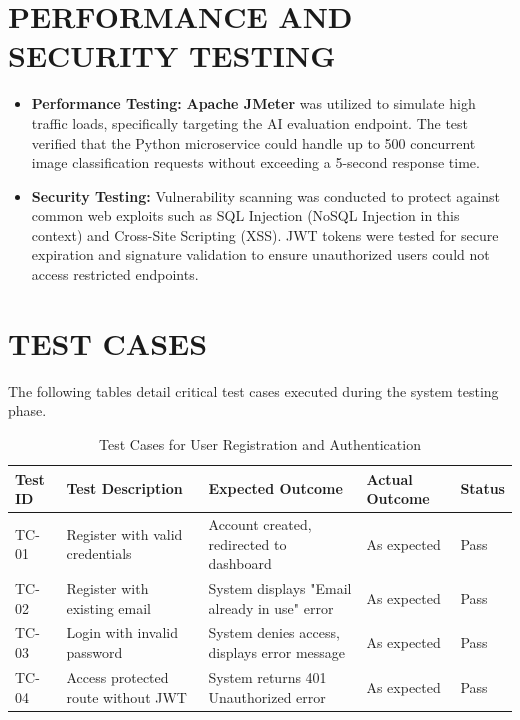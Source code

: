 \section{PERFORMANCE AND SECURITY TESTING}
\begin{itemize}
    \item \textbf{Performance Testing:} \textbf{Apache JMeter} was utilized to simulate high traffic loads, specifically targeting the AI evaluation endpoint. The test verified that the Python microservice could handle up to 500 concurrent image classification requests without exceeding a 5-second response time.
    \item \textbf{Security Testing:} Vulnerability scanning was conducted to protect against common web exploits such as SQL Injection (NoSQL Injection in this context) and Cross-Site Scripting (XSS). JWT tokens were tested for secure expiration and signature validation to ensure unauthorized users could not access restricted endpoints.
\end{itemize}

\section{TEST CASES}
The following tables detail critical test cases executed during the system testing phase.

\begin{table}[H]
\centering
\caption{Test Cases for User Registration and Authentication}
\renewcommand{\arraystretch}{1.5}
\begin{tabular}{|p{1.5cm}|p{4cm}|p{4cm}|p{3cm}|p{1.5cm}|}
\hline
\textbf{Test ID} & \textbf{Test Description} & \textbf{Expected Outcome} & \textbf{Actual Outcome} & \textbf{Status} \\
\hline
TC-01 & Register with valid credentials & Account created, redirected to dashboard & As expected & Pass \\
\hline
TC-02 & Register with existing email & System displays "Email already in use" error & As expected & Pass \\
\hline
TC-03 & Login with invalid password & System denies access, displays error message & As expected & Pass \\
\hline
TC-04 & Access protected route without JWT & System returns 401 Unauthorized error & As expected & Pass \\
\hline
\end{tabular}
\end{table}

